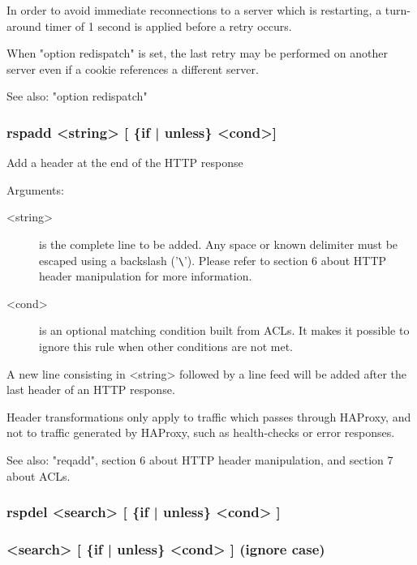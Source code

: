   In order to avoid immediate reconnections to a server which is restarting,
  a turn-around timer of 1 second is applied before a retry occurs.

  When "option redispatch" is set, the last retry may be performed on another
  server even if a cookie references a different server.

  See also: "option redispatch"

\subsubsection[rspadd]{rspadd <string> [ \{if | unless\} <cond>] }


  Add a header at the end of the HTTP response


  Arguments:
  \begin{description}
  \item[<string>] is the complete line to be added. Any space or known delimiter
              must be escaped using a backslash ('\verb|\|'). Please refer to section
              6 about HTTP header manipulation for more information.

  \item[<cond>] is an optional matching condition built from ACLs. It makes it
              possible to ignore this rule when other conditions are not met.
  \end{description}

  A new line consisting in <string> followed by a line feed will be added after
  the last header of an HTTP response.

  Header transformations only apply to traffic which passes through HAProxy,
  and not to traffic generated by HAProxy, such as health-checks or error
  responses.

  See also: "reqadd", section 6 about HTTP header manipulation, and section 7
            about ACLs.

\subsubsection[rspdel]{rspdel  <search> [ \{if | unless\} <cond> ]}
\subsubsection[rspidel]{<search> [ \{if | unless\} <cond> ]  (ignore case)}

